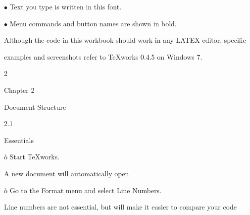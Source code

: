 \documentclass[a4paper,portrait,12pt]{article}
\begin{document}
\begin{flushleft}
$\bullet$ Text you type is written in this font.
\end{flushleft}


\begin{flushleft}
$\bullet$ Menu commands and button names are shown in bold.
\end{flushleft}


\begin{flushleft}
Although the code in this workbook should work in any LATEX editor, specific
\end{flushleft}


\begin{flushleft}
examples and screenshots refer to TeXworks 0.4.5 on Windows 7.
\end{flushleft}





2





\begin{flushleft}
\newpage
Chapter 2
\end{flushleft}


\begin{flushleft}
Document Structure
\end{flushleft}


2.1





\begin{flushleft}
Essentials
\end{flushleft}





\begin{flushleft}
\`{o} Start TeXworks.
\end{flushleft}


\begin{flushleft}
A new document will automatically open.
\end{flushleft}


\begin{flushleft}
\`{o} Go to the Format menu and select Line Numbers.
\end{flushleft}


\begin{flushleft}
Line numbers are not essential, but will make it easier to compare your code
\end{flushleft}
\end{document}
